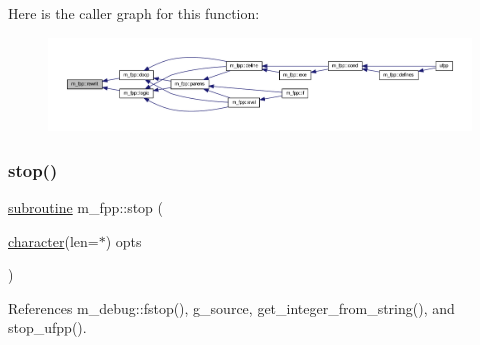 Here is the caller graph for this function\+:
\nopagebreak
\begin{figure}[H]
\begin{center}
\leavevmode
\includegraphics[width=350pt]{namespacem__fpp_aae0bad1c7d831068e28f5658d3e1827c_icgraph}
\end{center}
\end{figure}
\mbox{\label{namespacem__fpp_a636643b9e9981243fa2206a3368d01bf}} 
\subsubsection{\texorpdfstring{stop()}{stop()}}
{\footnotesize\ttfamily \hyperlink{M__stopwatch_83_8txt_acfbcff50169d691ff02d4a123ed70482}{subroutine} m\+\_\+fpp\+::stop (\begin{DoxyParamCaption}\item[{\hyperlink{option__stopwatch_83_8txt_abd4b21fbbd175834027b5224bfe97e66}{character}(len=$\ast$)}]{opts }\end{DoxyParamCaption})}



References m\+\_\+debug\+::fstop(), g\+\_\+source, get\+\_\+integer\+\_\+from\+\_\+string(), and stop\+\_\+ufpp().

